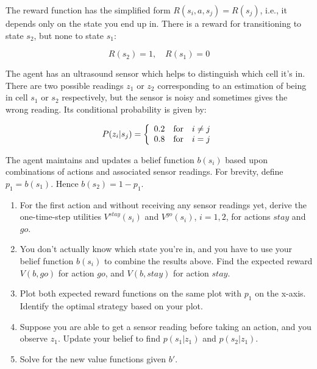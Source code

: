 \documentclass[12pt]{article}
\begin{document}
\noindent
The reward function has the simplified form $R(s_i,a,s_j) = R(s_j)$,
i.e., it depends only on the state you end up in.  There is a reward
for transitioning to state $s_2$, but none to state $s_1$:

$$R(s_2) = 1, \quad R(s_1) = 0$$

\noindent
The agent has an ultrasound sensor which helps to distinguish which
cell it's in.  There are two possible readings $z_1$ or $z_2$
corresponding to an estimation of being in cell $s_1$ or $s_2$
respectively, but the sensor is noisy and sometimes gives the wrong
reading.  Its conditional probability is given by:

$$P(z_i | s_j) = \left\{ \begin{array}{lll}
                                   0.2 & \hbox{for} & i\neq j \\
                                   0.8 & \hbox{for} & i = j
                            \end{array}
                    \right.$$

\noindent
The agent maintains and updates a belief function $b(s_i)$ based upon
combinations of actions and associated sensor readings.  For brevity,
define $p_1 = b(s_1)$.  Hence $b(s_2) = 1 - p_1$.

\begin{enumerate}

\item For the first action and without receiving any sensor readings
  yet, derive the one-time-step utilities $V^{stay}(s_i)$ and
  $V^{go}(s_i)$, $i=1,2$, for actions $stay$ and $go$.

\item You don't actually know which state you're in, and you have to
  use your belief function $b(s_i)$ to combine the results above.
  Find the expected reward $V(b,go)$ for action $go$, and $V(b,stay)$
  for action $stay$.

\item Plot both expected reward functions on the same plot with $p_1$
  on the x-axis.  Identify the optimal strategy based on your plot.

\item Suppose you are able to get a sensor reading before taking an
  action, and you observe $z_1$.  Update your belief to find $p(s_1 |
  z_1)$ and $p(s_2 | z_1)$.

\item Solve for the new value functions given $b'$.

\end{enumerate}
 
\end{document}
